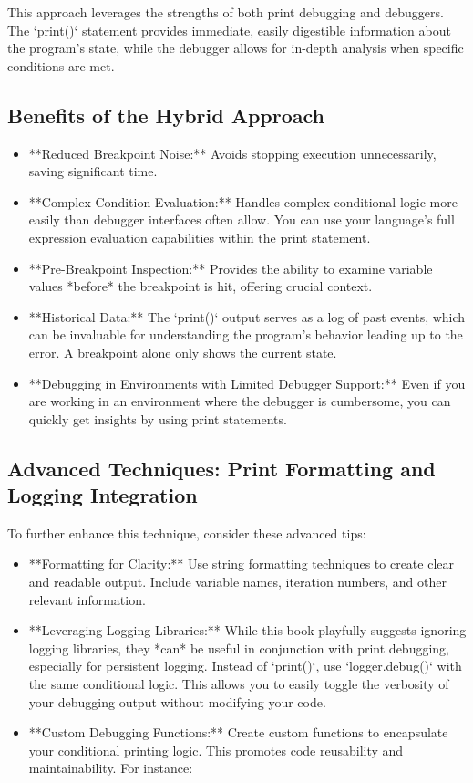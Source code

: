 \documentclass{article}
\begin{document}
{{{This approach leverages the strengths of both print debugging and debuggers. The `print()` statement provides immediate, easily digestible information about the program's state, while the debugger allows for in-depth analysis when specific conditions are met.

\subsection*{Benefits of the Hybrid Approach}

\begin{itemize}
    \item **Reduced Breakpoint Noise:** Avoids stopping execution unnecessarily, saving significant time.
    \item **Complex Condition Evaluation:**  Handles complex conditional logic more easily than debugger interfaces often allow. You can use your language's full expression evaluation capabilities within the print statement.
    \item **Pre-Breakpoint Inspection:** Provides the ability to examine variable values *before* the breakpoint is hit, offering crucial context.
    \item **Historical Data:**  The `print()` output serves as a log of past events, which can be invaluable for understanding the program's behavior leading up to the error. A breakpoint alone only shows the current state.
    \item **Debugging in Environments with Limited Debugger Support:** Even if you are working in an environment where the debugger is cumbersome, you can quickly get insights by using print statements.
\end{itemize}

\subsection*{Advanced Techniques: Print Formatting and Logging Integration}

To further enhance this technique, consider these advanced tips:

\begin{itemize}
    \item **Formatting for Clarity:** Use string formatting techniques to create clear and readable output.  Include variable names, iteration numbers, and other relevant information.
    \item **Leveraging Logging Libraries:** While this book playfully suggests ignoring logging libraries, they *can* be useful in conjunction with print debugging, especially for persistent logging. Instead of `print()`, use `logger.debug()` with the same conditional logic. This allows you to easily toggle the verbosity of your debugging output without modifying your code.
    \item **Custom Debugging Functions:** Create custom functions to encapsulate your conditional printing logic. This promotes code reusability and maintainability. For instance:


\end{itemize}}}}
\end{document}

